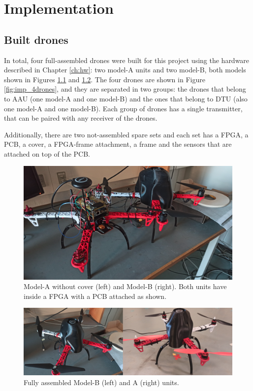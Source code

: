 \chapter{Implementation}\label{ch:impl}

\section{Built drones}

In total, four full-assembled drones were built for this project using the hardware described in Chapter \ref{ch:hw}: two model-A units and two model-B, both models shown in Figures \ref{fig:imp_models_noCover} and \ref{fig:imp_modelsFULL}. The four drones are shown in Figure \ref{fig:imp_4drones}, and they are separated in two groups: the drones that belong to AAU (one model-A and one model-B) and the ones that belong to DTU (also one model-A and one model-B). Each group of drones has a single transmitter, that can be paired with any receiver of the drones.

Additionally, there are two not-assembled spare sets and each set has a FPGA, a PCB, a cover, a FPGA-frame attachment, a frame and the sensors that are attached on top of the PCB.


\begin{figure} [H]
    \centering
    \includegraphics[width=\textwidth]{Figures/implementation/modelA_and_B.png}
    \caption{Model-A without cover (left) and Model-B (right). Both units have inside a FPGA with a PCB attached as shown.}
    \label{fig:imp_models_noCover}
\end{figure}

\begin{figure} [H]
    \centering
    \includegraphics[width=\textwidth]{Figures/implementation/modelA_and_B_assembled.png}
    \caption{Fully assembled Model-B (left) and A (right) units.}
    \label{fig:imp_modelsFULL}
\end{figure}


